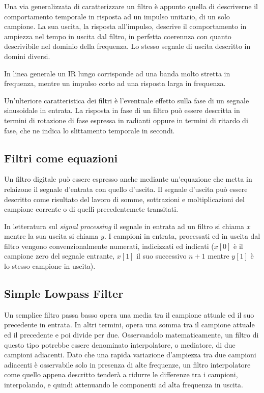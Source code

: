 Una via generalizzata di caratterizzare un filtro è appunto quella di descriverne
il comportamento temporale in risposta ad un impulso unitario, di un solo campione.
La sua uscita, la risposta all'impulso, descrive il comportamento in ampiezza nel
tempo in uscita dal filtro, in perfetta coerennza con quanto descrivibile nel dominio
della frequenza. Lo stesso segnale di uscita descritto in domini diversi.

In linea generale un IR lungo corrisponde ad una banda molto stretta in frequenza,
mentre un impulso corto ad una risposta larga in frequenza.

Un'ulteriore caratteristica dei filtri è l'eventuale effetto sulla fase di un
segnale sinusoidale in entrata. La risposta in fase di un filtro può essere descritta
in termini di rotazione di fase espressa in radianti oppure in termini di ritardo
di fase, che ne indica lo slittamento temporale in secondi.

\subsection{Filtri come equazioni}

Un filtro digitale può essere espresso anche mediante un'equazione che metta in
relaizone il segnale d'entrata con quello d'uscita. Il segnale d'uscita può essere
descritto come risultato del lavoro di somme, sottrazioni e moltiplicazioni del
campione corrente o di quelli precedentemete transitati.

In letteratura sul \emph{signal processing} il segnale in entrata ad un filtro si
chiama $ x $ mentre la sua uscita si chiama $ y $. I campioni in entrata, processati
ed in uscita dal filtro vengono convenzionalmente numerati, indicizzati ed indicati
($ x[0] $ è il campione zero del segnale entrante, $ x[1] $ il suo successivo
$ n+1 $ mentre $ y[1] $ è lo stesso campione in uscita).

\subsection{Simple Lowpass Filter}

Un semplice filtro passa basso opera una media tra il campione attuale ed il suo
precedente in entrata. In altri termini, opera una somma tra il campione attuale
ed il precedente e poi divide per due. Osservandolo matematicamente, un filtro di
questo tipo potrebbe essere denominato interpolatore, o mediatore, di due
campioni adiacenti. Dato che una rapida variazione d'ampiezza tra due campioni
adiacenti è osservabile solo in presenza di alte frequenze, un filtro interpolatore
come quello appena descritto tenderà a ridurre le differenze tra i campioni,
interpolando, e quindi attenuando le componenti ad alta frequenza in uscita.

